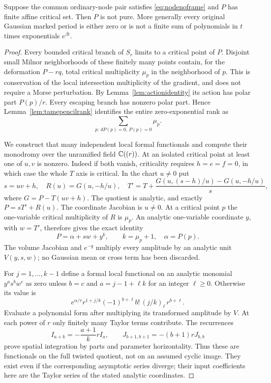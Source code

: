 \begin{proposition}\label{prop:ordinaryfinite}
Suppose the common ordinary-node pair satisfies
\eqref{eq:nodenoframe} and $P$ has finite affine critical set.
Then $P$ is not pure. More generally every original Gaussian
marked period is either zero or is not a finite sum of
polynomials in $t$ times exponentials $e^{\beta t}$.
\end{proposition}
\begin{proof}
Every bounded critical branch of $S_r$ limits to a critical point
of $P$. Disjoint small Milnor neighborhoods of these finitely many
points contain, for the deformation $P-rq$, total critical
multiplicity $\mu_p$ in the neighborhood of $p$. This is
conservation of the local intersection multiplicity of the
gradient, and does not require a Morse perturbation. By
Lemma~\ref{lem:actionidentity} its action has polar part
$P(p)/r$. Every escaping branch has nonzero polar part. Hence
Lemma~\ref{lem:tamepencilrank} identifies the entire zero-exponential
rank as
\begin{equation}\label{eq:ordinaryzerorank}
 \sum_{p:\,dP(p)=0,\,P(p)=0}\mu_p.
\end{equation}

We construct that many independent local formal functionals and
compute their monodromy over the unramified field $\mathbb C((r))$.
At an isolated critical point at least one of $u,v$ is nonzero.
Indeed if both vanish, criticality requires $h=e=f=0$, in which
case the whole $T$ axis is critical. In the chart $u\ne0$ put
\[
 s=uv+h,\quad R(u)=G(u,-h/u),\quad
 T'=T+\frac{G(u,(s-h)/u)-G(u,-h/u)}s,
\]
where $G=P-T(uv+h)$. The quotient is analytic, and exactly
$P=sT'+R(u)$. The coordinate Jacobian is $u\ne0$. At a critical
point $p$ the one-variable critical multiplicity of $R$ is
$\mu_p$. An analytic one-variable coordinate $y$, with
$w=T'$, therefore gives the exact identity
\[
 P=\alpha+sw+y^k,\qquad k=\mu_p+1,\quad\alpha=P(p).
\]
The volume Jacobian and $e^{-q}$ multiply every amplitude by an
analytic unit $V(y,s,w)$; no Gaussian mean or cross term has been
discarded.

For $j=1,\ldots,k-1$ define a formal local functional on an
analytic monomial $y^a s^b w^c$ as zero unless $b=c$ and
$a=j-1+\ell k$ for an integer $\ell\ge0$. Otherwise its value is
\begin{equation}\label{eq:ordinarycharacters}
 e^{\alpha/r}r^{1+j/k}
       (-1)^{b+\ell}b!\,(j/k)_\ell\,r^{b+\ell}.
\end{equation}
Evaluate a polynomial form after multiplying its transformed
amplitude by $V$. At each power of $r$ only finitely many Taylor
terms contribute. The recurrences
\[
 I_{a+k}=-\frac{a+1}{k}r I_a,\qquad
 J_{b+1,b+1}=-(b+1)rJ_{b,b}
\]
prove spatial integration by parts and parameter horizontality.
Thus these are functionals on the full twisted quotient, not on
an assumed cyclic image. They exist even if the corresponding
asymptotic series diverge; their input coefficients here are the
Taylor series of the stated analytic coordinates.


\end{proof}
